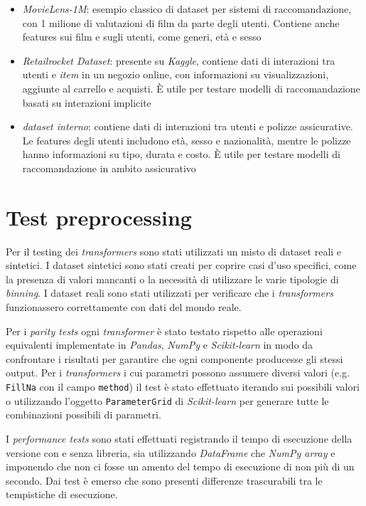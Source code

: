 \begin{itemize}
    \item \textit{MovieLens-1M}: esempio classico di dataset per sistemi di raccomandazione, con 1 milione di valutazioni di film da parte degli utenti. Contiene anche features sui film e sugli utenti, come generi, età e sesso
    \item \textit{Retailrocket Dataset}: presente su \textit{Kaggle}, contiene dati di interazioni tra utenti e \textit{item} in un negozio online, con informazioni su visualizzazioni, aggiunte al carrello e acquisti. È utile per testare modelli di raccomandazione basati su interazioni implicite
    \item \textit{dataset interno}: contiene dati di interazioni tra utenti e polizze assicurative. Le features degli utenti includono età, sesso e nazionalità, mentre le polizze hanno informazioni su tipo, durata e costo. È utile per testare modelli di raccomandazione in ambito assicurativo
\end{itemize}

\section{Test preprocessing}
Per il testing dei \textit{transformers} sono stati utilizzati un misto di dataset reali e sintetici. I dataset sintetici sono stati creati per coprire casi d'uso specifici, come la presenza di valori mancanti o la necessità di utilizzare le varie tipologie di \textit{binning}. I dataset reali sono stati utilizzati per verificare che i \textit{transformers} funzionassero correttamente con dati del mondo reale.  

Per i \textit{parity tests} ogni \textit{transformer} è stato testato rispetto alle operazioni equivalenti implementate in \textit{Pandas}, \textit{NumPy} e \textit{Scikit-learn} in modo da confrontare i risultati per garantire che ogni componente producesse gli stessi output. Per i \textit{transformers} i cui parametri possono assumere diversi valori (e.g. \texttt{FillNa} con il campo \texttt{method}) il test è stato effettuato iterando sui possibili valori o utilizzando l'oggetto \texttt{ParameterGrid} di \textit{Scikit-learn} per generare tutte le combinazioni possibili di parametri. 

I \textit{performance tests} sono stati effettuati registrando il tempo di esecuzione della versione con e senza libreria, sia utilizzando \textit{DataFrame} che \textit{NumPy array} e imponendo che non ci fosse un amento del tempo di esecuzione di non più di un secondo. Dai test è emerso che sono presenti differenze trascurabili tra le tempistiche di esecuzione.

